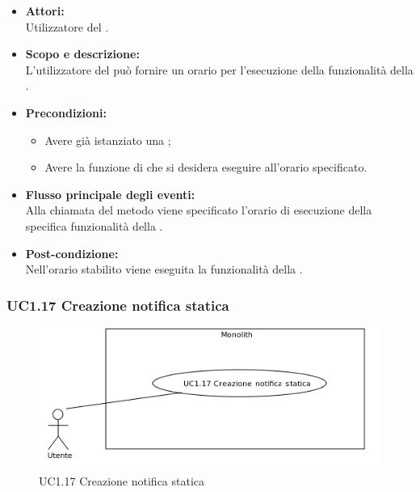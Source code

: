 \begin{itemize}
	\item \textbf{Attori:}
	\\Utilizzatore del .
	\item \textbf{Scopo e descrizione:} 
	\\L'utilizzatore del  può fornire un orario per l'esecuzione della funzionalità della .
	\item \textbf{Precondizioni:}
	\begin{itemize}
		\item Avere già istanziato una ;
		\item Avere la funzione di  che si desidera eseguire all'orario specificato.
	\end{itemize}
	\item \textbf{Flusso principale degli eventi:}
	\\Alla chiamata del metodo viene specificato l'orario di esecuzione della specifica funzionalità della .
	\item \textbf{Post-condizione:}
	\\Nell'orario stabilito viene eseguita la funzionalità della .
\end{itemize}

\subsubsection{UC1.17 Creazione notifica statica} \label{UC1.17}

\begin{figure}[H]
	\centering
	\includegraphics[width=15cm]{../../documenti/AnalisiDeiRequisiti/Diagrammi_img/uc1_17.png}
	\caption{UC1.17 Creazione notifica statica}
\end{figure}


